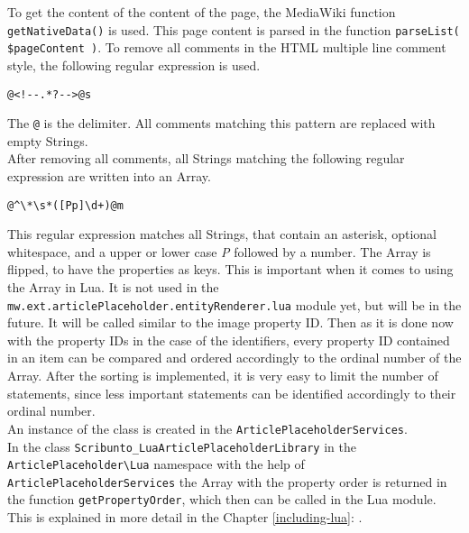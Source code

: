 To get the content of the content of the page, the MediaWiki function \texttt{\justify getNativeData()} is used. This page content is parsed in the function \texttt{\justify parseList( \$pageContent )}. To remove all comments in the HTML multiple line comment style, the following regular expression is used.
\begin{lstlisting}[frame=single]
@<!--.*?-->@s
\end{lstlisting}
The \texttt{\justify @} is the delimiter. All comments matching this pattern are replaced with empty Strings. \\
After removing all comments, all Strings matching the following regular expression are written into an Array.
\begin{lstlisting}[frame=single] 
@^\*\s*([Pp]\d+)@m
\end{lstlisting}
This regular expression matches all Strings, that contain an asterisk, optional whitespace, and a upper or lower case \textit{P} followed by a number.
The Array is flipped, to have the properties as keys. This is important when it comes to using the Array in Lua. It is not used in the \texttt{\justify mw.ext.articlePlaceholder.entityRenderer.lua} module yet, but will be in the future. It will be called similar to the image property ID. Then as it is done now with the property IDs in the case of the identifiers, every property ID contained in an item can be compared and ordered accordingly to the ordinal number of the Array.  After the sorting is implemented, it is very easy to limit the number of statements, since less important statements can be identified accordingly to their ordinal number. \\
An instance of the class is created in the \texttt{\justify ArticlePlaceholderServices}. \\
In the class \texttt{\justify Scribunto\_LuaArticlePlaceholderLibrary} in the \texttt{\justify ArticlePlaceholder\textbackslash{}Lua} namespace with the help of \texttt{\justify ArticlePlaceholderServices} the Array with the property order is returned in the function \texttt{\justify getPropertyOrder}, which then can be called in the Lua module. This is explained in more detail in the Chapter \ref{including-lua}: .

